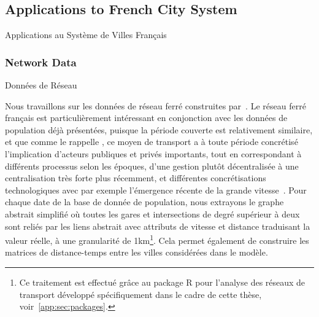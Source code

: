 \subsection{Applications to French City System}{Applications au Système de Villes Français}






\subsubsection{Network Data}{Données de Réseau}

Nous travaillons sur les données de réseau ferré construites par~\cite{thevenin2013mapping}. Le réseau ferré français est particulièrement intéressant en conjonction avec les données de population déjà présentées, puisque la période couverte est relativement similaire, et que comme le rappelle \cite{thevenin2013mapping}, ce moyen de transport a à toute période concrétisé l'implication d'acteurs publiques et privés importants, tout en correspondant à différents processus selon les époques, d'une gestion plutôt décentralisée à une centralisation très forte plus récemment, et différentes concrétisations technologiques avec par exemple l'émergence récente de la grande vitesse~\cite{zembri1997fondements}. Pour chaque date de la base de donnée de population, nous extrayons le graphe abstrait simplifié où toutes les gares et intersections de degré supérieur à deux sont reliés par les liens abstrait avec attributs de vitesse et distance traduisant la valeur réelle, à une granularité de 1km\footnote{Ce traitement est effectué grâce au package R pour l'analyse des réseaux de transport développé spécifiquement dans le cadre de cette thèse, voir~\ref{app:sec:packages}.}. Cela permet également de construire les matrices de distance-temps entre les villes considérées dans le modèle.




